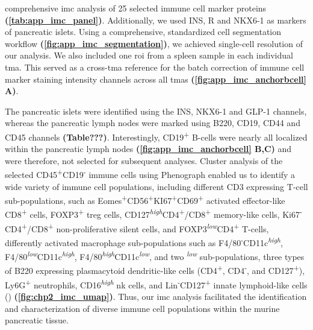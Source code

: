 comprehensive \gls{imc} analysis of 25 selected immune cell marker proteins \textbf{(\autoref{tab:app_imc_panel})}. Additionally, we used INS, R and NKX6-1 as markers of pancreatic islets. Using a comprehensive, standardized cell segmentation workflow \textbf{(\autoref{fig:app_imc_segmentation})}, we achieved single-cell resolution of our  analysis. We also included one \gls{roi} from a spleen sample in each individual \gls{tma}. This served as a cross-\gls{tma} reference for the batch correction of immune cell marker staining intensity channels across all \glspl{tma} \textbf{(\autoref{fig:app_imc_anchorbcell} A)}.\\
\par The pancreatic islets were identified using the INS, NKX6-1 and GLP-1 channels, whereas the pancreatic lymph nodes were marked using B220, CD19, CD44 and CD45 channels \textbf{(Table???)}. Interestingly, CD19\textsuperscript{+} B-cells were nearly all localized within the pancreatic lymph nodes \textbf{(\autoref{fig:app_imc_anchorbcell} B,C)} and were therefore, not selected for subsequent analyses. Cluster analysis of the selected CD45\textsuperscript{+}CD19\textsuperscript{-} immune cells using Phenograph enabled us to identify a wide variety of immune cell populations, including different CD3 expressing T-cell sub-populations, such as Eomes\textsuperscript{+}CD56\textsuperscript{+}KI67\textsuperscript{+}CD69\textsuperscript{+} activated effector-like CD8\textsuperscript{+} cells, FOXP3\textsuperscript{+} \gls{treg} cells, CD127\textsuperscript{\textit{high}}CD4\textsuperscript{+}/CD8\textsuperscript{+} memory-like cells, Ki67\textsuperscript{-}CD4\textsuperscript{+}/CD8\textsuperscript{+} non-proliferative silent cells, and FOXP3\textsuperscript{\textit{low}}CD4\textsuperscript{+} T-cells, differently activated macrophage sub-populations such as F4/80\textsuperscript{-}CD11c\textsuperscript{\textit{high}}, F4/80\textsuperscript{\textit{low}}CD11c\textsuperscript{\textit{high}}, F4/80\textsuperscript{\textit{high}}CD11c\textsuperscript{\textit{low}}, and two \textsuperscript{\textit{low}} sub-populations, three types of B220 expressing plasmacytoid dendritic-like cells (CD4\textsuperscript{+}, CD4\textsuperscript{-}, and CD127\textsuperscript{+}), Ly6G\textsuperscript{+} neutrophils, CD16\textsuperscript{\textit{high}} \gls{nk} cells, and Lin\textsuperscript{-}CD127\textsuperscript{+} innate lymphoid-like cells () \textbf{(\autoref{fig:chp2_imc_umap})}. Thus, our \gls{imc} analysis facilitated the identification and characterization of diverse immune cell populations within the murine pancreatic tissue.

